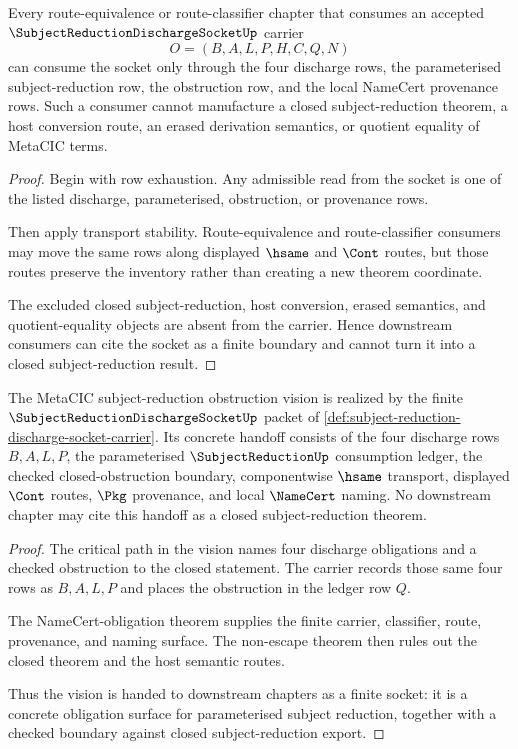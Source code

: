 \begin{theorem}
\label{thm:subject-reduction-discharge-socket-downstream-consumer-boundary}
Every route-equivalence or route-classifier chapter that consumes an accepted $\SubjectReductionDischargeSocketUp$ carrier
$$
O=(B,A,L,P,H,C,Q,N)
$$
can consume the socket only through the four discharge rows, the parameterised subject-reduction row, the obstruction row, and the local NameCert provenance rows. Such a consumer cannot manufacture a closed subject-reduction theorem, a host conversion route, an erased derivation semantics, or quotient equality of MetaCIC terms.
\end{theorem}
\begin{proof}
Begin with row exhaustion. Any admissible read from the socket is one of the listed discharge, parameterised, obstruction, or provenance rows.

Then apply transport stability. Route-equivalence and route-classifier consumers may move the same rows along displayed $\hsame$ and $\Cont$ routes, but those routes preserve the inventory rather than creating a new theorem coordinate.

The excluded closed subject-reduction, host conversion, erased semantics, and quotient-equality objects are absent from the carrier. Hence downstream consumers can cite the socket as a finite boundary and cannot turn it into a closed subject-reduction result.
\end{proof}

\begin{theorem}
\label{thm:subject-reduction-discharge-socket-vision-handoff}
The MetaCIC subject-reduction obstruction vision is realized by the finite $\SubjectReductionDischargeSocketUp$ packet of \autoref{def:subject-reduction-discharge-socket-carrier}. Its concrete handoff consists of the four discharge rows $B,A,L,P$, the parameterised $\SubjectReductionUp$ consumption ledger, the checked closed-obstruction boundary, componentwise $\hsame$ transport, displayed $\Cont$ routes, $\Pkg$ provenance, and local $\NameCert$ naming. No downstream chapter may cite this handoff as a closed subject-reduction theorem.
\end{theorem}
\begin{proof}
The critical path in the vision names four discharge obligations and a checked obstruction to the closed statement. The carrier records those same four rows as $B,A,L,P$ and places the obstruction in the ledger row $Q$.

The NameCert-obligation theorem supplies the finite carrier, classifier, route, provenance, and naming surface. The non-escape theorem then rules out the closed theorem and the host semantic routes.

Thus the vision is handed to downstream chapters as a finite socket: it is a concrete obligation surface for parameterised subject reduction, together with a checked boundary against closed subject-reduction export.
\end{proof}

